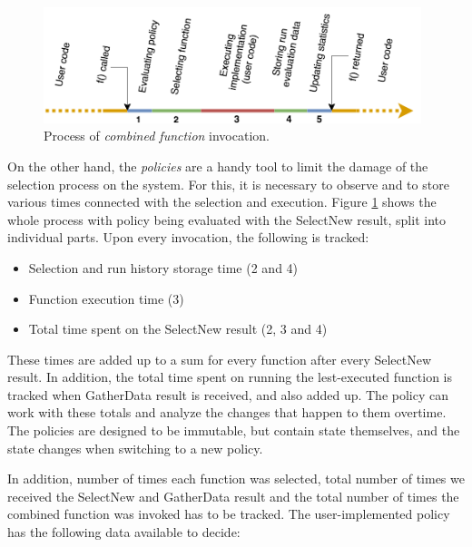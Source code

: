 \begin{figure}[h!]
	\centerline{\mbox{\includegraphics[width=110mm]{./img/run_schema.png}}}
	\caption{Process of \textit{combined function} invocation.}
	\label{fig:run_schema}
\end{figure}

On the other hand, the \textit{policies} are a handy tool to limit the damage of the selection process on the system. For this, it is necessary to observe and to store various times connected with the selection and execution. Figure \ref{fig:run_schema} shows the whole process with policy being evaluated with the SelectNew result, split into individual parts. Upon every invocation, the following is tracked:

\begin{itemize}
	\item Selection and run history storage time (2 and 4)
	\item Function execution time (3)
	\item Total time spent on the SelectNew result (2, 3 and 4)
\end{itemize}

These times are added up to a sum for every function after every SelectNew result. In addition, the total time spent on running the lest-executed function is tracked when GatherData result is received, and also added up. The policy can work with these totals and analyze the changes that happen to them overtime. The policies are designed to be immutable, but contain state themselves, and the state changes when switching to a new policy.

In addition, number of times each function was selected, total number of times we received the SelectNew and GatherData result and the total number of times the combined function was invoked has to be tracked. The user-implemented policy has the following data available to decide:

